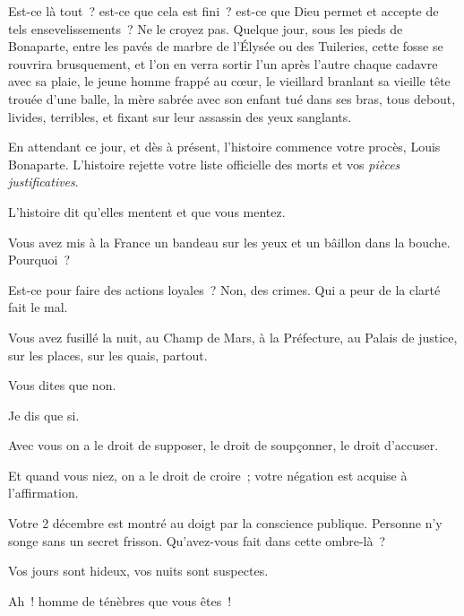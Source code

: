 \documentclass[french,twoside]{book} %
\newcommand{\astertri}{\medskip\par\centerline{\color{rubric}\large\selectfont{\syms ✻\,✻\,✻}}\medskip\par}%
\begin{document}
Est-ce là tout ? est-ce que cela est fini ? est-ce que Dieu permet et accepte de tels ensevelissements ? Ne le croyez pas. Quelque jour, sous les pieds de Bonaparte, entre les pavés de marbre de l’Élysée ou des Tuileries, cette fosse se rouvrira brusquement, et l’on en verra sortir l’un après l’autre chaque cadavre avec sa plaie, le jeune homme frappé au cœur, le vieillard branlant sa vieille tête trouée d’une balle, la mère sabrée avec son enfant tué dans ses bras, tous debout, livides, terribles, et fixant sur leur assassin des yeux sanglants.\par
En attendant ce jour, et dès à présent, l’histoire commence votre procès, Louis Bonaparte. L’histoire rejette votre liste officielle des morts et vos \emph{pièces justificatives}.\par
L’histoire dit qu’elles mentent et que vous mentez.\par
Vous avez mis à la France un bandeau sur les yeux et un bâillon dans la bouche. Pourquoi ?\par
Est-ce pour faire des actions loyales ? Non, des crimes. Qui a peur de la clarté fait le mal.\par
Vous avez fusillé la nuit, au Champ de Mars, à la Préfecture, au Palais de justice, sur les places, sur les quais, partout.\par
Vous dites que non.\par
Je dis que si.\par
Avec vous on a le droit de supposer, le droit de soupçonner, le droit d’accuser.\par
Et quand vous niez, on a le droit de croire ; votre négation est acquise à l’affirmation.\par
Votre 2 décembre est montré au doigt par la conscience publique. Personne n’y songe sans un secret frisson. Qu’avez-vous fait dans cette ombre-là ?\par
Vos jours sont hideux, vos nuits sont suspectes.\par
Ah ! homme de ténèbres que vous êtes !\par

\astertri
\end{document}
